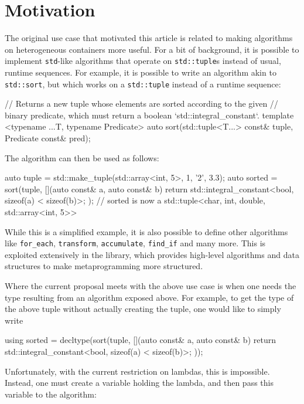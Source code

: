 \documentclass{wg21}
\newcommand{\cc}[1]{\texttt{#1}}
\begin{document}
\section{Motivation}
The original use case that motivated this article is related to making algorithms
on heterogeneous containers more useful. For a bit of background, it is possible
to implement \cc{std}-like algorithms that operate on \cc{std::tuple}s instead of
usual, runtime sequences. For example, it is possible to write an algorithm akin
to \cc{std::sort}, but which works on a \cc{std::tuple} instead of a runtime
sequence:

\begin{cpp}
// Returns a new tuple whose elements are sorted according to the given
// binary predicate, which must return a boolean `std::integral_constant`.
template <typename ...T, typename Predicate>
auto sort(std::tuple<T...> const& tuple, Predicate const& pred);
\end{cpp}

The algorithm can then be used as follows:

\begin{cpp}
auto tuple = std::make_tuple(std::array<int, 5>{}, 1, '2', 3.3);
auto sorted = sort(tuple, [](auto const& a, auto const& b) {
  return std::integral_constant<bool, sizeof(a) < sizeof(b)>{};
});
// sorted is now a std::tuple<char, int, double, std::array<int, 5>>
\end{cpp}

While this is a simplified example, it is also possible to define other algorithms
like \cc{for_each}, \cc{transform}, \cc{accumulate}, \cc{find_if} and many more. This
is exploited extensively in the \cite{Boost.Hana} library, which provides high-level
algorithms and data structures to make metaprogramming more structured.

Where the current proposal meets with the above use case is when one needs the type
resulting from an algorithm exposed above. For example, to get the type of the above
tuple without actually creating the tuple, one would like to simply write

\begin{cpp}
using sorted = decltype(sort(tuple, [](auto const& a, auto const& b) {
  return std::integral_constant<bool, sizeof(a) < sizeof(b)>{};
}));
\end{cpp}

Unfortunately, with the current restriction on lambdas, this is impossible.
Instead, one must create a variable holding the lambda, and then pass this
variable to the algorithm:
\end{document}
